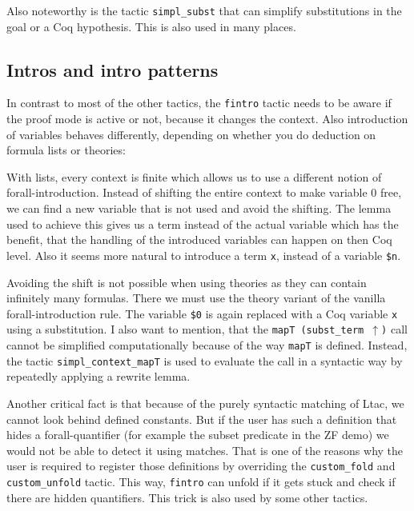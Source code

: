 \documentclass[12pt, a4paper]{article}
\begin{document}
\medskip\noindent
Also noteworthy is the tactic \texttt{simpl\_subst} that can simplify substitutions in the goal or a Coq hypothesis.
This is also used in many places.



\subsection{Intros and intro patterns}

In contrast to most of the other tactics, the \texttt{fintro} tactic needs to be aware if the proof mode is active or not, because it changes the context.
Also introduction of variables behaves differently, depending on whether you do deduction on formula lists or theories:

\medskip\noindent
With lists, every context is finite which allows us to use a different notion of forall-introduction.
Instead of shifting the entire context to make variable 0 free, we can find a new variable that is not used and avoid the shifting.
The lemma used to achieve this gives us a term instead of the actual variable which has the benefit, that the handling of the introduced variables can happen on then Coq level.
Also it seems more natural to introduce a term \texttt{x}, instead of a variable \texttt{\$n}.

Avoiding the shift is not possible when using theories as they can contain infinitely many formulas.
There we must use the theory variant of the vanilla forall-introduction rule.
The variable \texttt{\$0} is again replaced with a Coq variable \texttt{x} using a substitution.
I also want to mention, that the \texttt{mapT (subst\_term $\uparrow$)} call cannot be simplified computationally because of the way \texttt{mapT} is defined.
Instead, the tactic \texttt{simpl\_context\_mapT} is used to evaluate the call in a syntactic way by repeatedly applying a rewrite lemma.

\medskip\noindent
Another critical fact is that because of the purely syntactic matching of Ltac, we cannot look behind defined constants.
But if the user has such a definition that hides a forall-quantifier (for example the subset predicate in the ZF demo) we would not be able to detect it using matches.
That is one of the reasons why the user is required to register those definitions by overriding the \texttt{custom\_fold} and \texttt{custom\_unfold} tactic.
This way, \texttt{fintro} can unfold if it gets stuck and check if there are hidden quantifiers.
This trick is also used by some other tactics.
\end{document}

